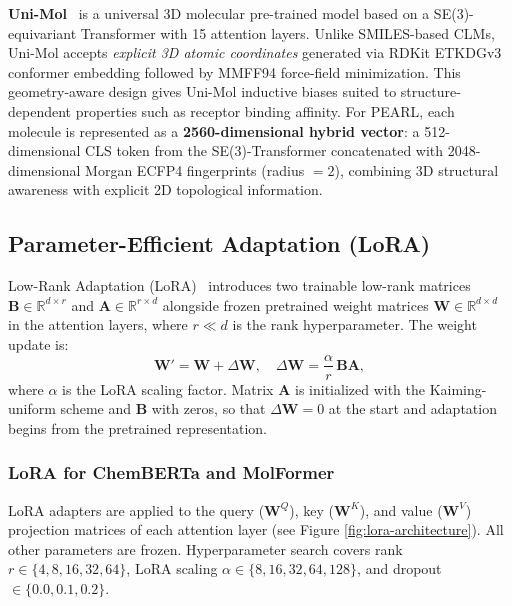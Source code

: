 \documentclass[pdflatex,sn-basic]{sn-jnl}%
\begin{document}
\textbf{Uni-Mol}~\cite{zhou2023unimol} is a universal 3D molecular pre-trained model based on a SE(3)-equivariant Transformer with 15 attention layers. Unlike SMILES-based CLMs, Uni-Mol accepts \emph{explicit 3D atomic coordinates} generated via RDKit ETKDGv3 conformer embedding followed by MMFF94 force-field minimization. This geometry-aware design gives Uni-Mol inductive biases suited to structure-dependent properties such as receptor binding affinity. For PEARL, each molecule is represented as a \textbf{2560-dimensional hybrid vector}: a 512-dimensional CLS token from the SE(3)-Transformer concatenated with 2048-dimensional Morgan ECFP4 fingerprints (radius $= 2$), combining 3D structural awareness with explicit 2D topological information.

\subsection{Parameter-Efficient Adaptation (LoRA)}\label{sec:lora}
Low-Rank Adaptation (LoRA)~\cite{hu2021lora} introduces two trainable low-rank matrices $\mathbf{B} \in \mathbb{R}^{d \times r}$ and $\mathbf{A} \in \mathbb{R}^{r \times d}$ alongside frozen pretrained weight matrices $\mathbf{W} \in \mathbb{R}^{d \times d}$ in the attention layers, where $r \ll d$ is the rank hyperparameter. The weight update is:
\begin{equation}
  \mathbf{W}' = \mathbf{W} + \Delta\mathbf{W}, \quad \Delta\mathbf{W} = \frac{\alpha}{r}\,\mathbf{B}\mathbf{A},
\end{equation}
where $\alpha$ is the LoRA scaling factor. Matrix $\mathbf{A}$ is initialized with the Kaiming-uniform scheme and $\mathbf{B}$ with zeros, so that $\Delta\mathbf{W}=0$ at the start and adaptation begins from the pretrained representation.

\subsubsection{LoRA for ChemBERTa and MolFormer}
LoRA adapters are applied to the query ($\mathbf{W}^Q$), key ($\mathbf{W}^K$), and value ($\mathbf{W}^V$) projection matrices of each attention layer (see Figure \ref{fig:lora-architecture}). All other parameters are frozen. Hyperparameter search covers rank $r \in \{4, 8, 16, 32, 64\}$, LoRA scaling $\alpha \in \{8, 16, 32, 64, 128\}$, and dropout $\in \{0.0, 0.1, 0.2\}$.
\end{document}
